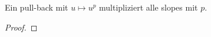 \begin{comment}
\begin{bem}[versuch 1] %
Wieso sieht die Wirkung auf dem pull-back Zusammenhang so aus?\\
Betrachte ein Element der Form $f(t)m=f(\rho(u))m$.
\begin{align*}
\partial_t(f(t)m) &= \partial_{\rho(u)}(f(\rho(u))m) \\
                  &= f'(\rho(u))\cdot \underset{=1}
                    {\underbrace{\frac{\partial(f(u))}{\partial(f(u))}}}m +
                    f(\rho(u))\underset{=\partial_t}
                    {\underbrace{\partial_{\rho(u)}}}m = (\star)\\
\end{align*}
\begin{align*}
\rho'(u)^{-1}\partial_u(f(t)m) &= \frac{1}{pu^{p-1}}\partial_u(f(u^p)m) \\
                               &= f'(u^p)m+f(u^p)\frac{1}{pu^{p-1}}\partial_u m
                                 = (\star) \\
\end{align*}
Also gilt $\partial_t(f(t)m) = \rho'(u)^{-1}\partial_u(f(t)m)$ und somit ist
die Wirkung von $\partial_t$ gleich der Wirkung von $\rho'(u)^{-1}\partial_u$.
\end{bem}
\end{comment}
%
\begin{lem}
Ein pull-back mit $u\mapsto u^p$ multipliziert alle slopes mit $p$.
\end{lem}
\begin{proof}
\end{proof}
%
